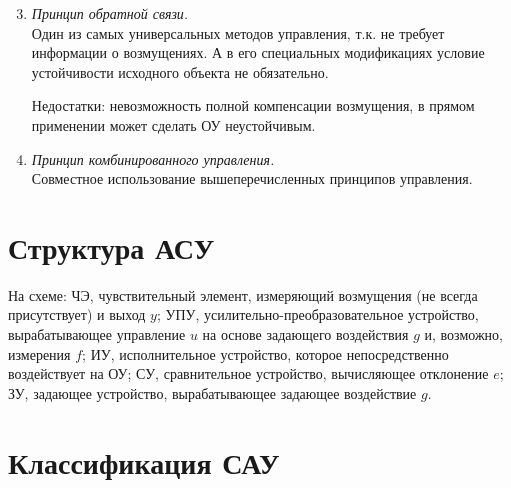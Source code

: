 \documentclass[../TAU.tex]{subfiles}
\theoremstyle{plain}
\theoremstyle{definition}
\theoremstyle{remark}
\theoremstyle{plain}
\begin{document}
\begin{enumerate}
\setcounter{enumi}{2}
\item {\it Принцип обратной связи.}\\
Один из самых универсальных методов управления, т.к. не требует информации о возмущениях. А в его специальных модификациях условие устойчивости исходного объекта не обязательно.
\begin{center}
\end{center}
Недостатки: невозможность полной компенсации возмущения, в прямом применении может сделать ОУ неустойчивым.
\item {\it Принцип комбинированного управления.}\\
Совместное использование вышеперечисленных принципов управления.
\end{enumerate}






\section{Структура АСУ}

\begin{center}
\end{center}

На схеме: ЧЭ, чувствительный элемент, измеряющий возмущения (не всегда присутствует) и выход $y$; УПУ, усилительно-преобразовательное устройство, вырабатывающее управление $u$ на основе задающего воздействия $g$ и, возможно, измерения $f$; ИУ, исполнительное устройство, которое непосредственно воздействует на ОУ; СУ, сравнительное устройство, вычисляющее отклонение $e$; ЗУ, задающее устройство, вырабатывающее задающее воздействие $g$.




\section{Классификация САУ}
\end{document}
